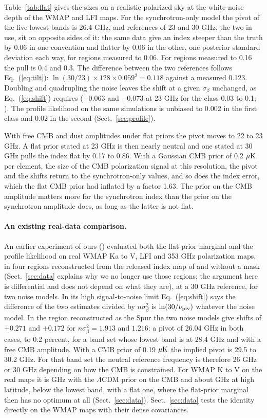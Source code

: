 Table~\ref{tab:flat} gives the sizes on a realistic polarized sky at the white-noise depth of the
WMAP and LFI maps. For the synchrotron-only model the pivot of the five lowest bands is 26.4 GHz, and
references of 23 and 30 GHz, the two in use, sit on opposite sides of it: the same data give an
index steeper than the truth by 0.06 in one convention and flatter by 0.06 in the other, one
posterior standard deviation each way, for regions measured to 0.06. For regions measured to 0.16
the pull is 0.4 and 0.3. The difference between the two references follows Eq.~(\ref{eq:tilt}):
$\ln(30/23)\times128\times0.059^2 = 0.118$ against a measured 0.123. Doubling and quadrupling the
noise leaves the shift at a given $\sigma_\beta$ unchanged, as Eq.~(\ref{eq:shift}) requires
($-0.063$ and $-0.073$ at 23 GHz for the class 0.03 to 0.1; ). The profile likelihood on
the same simulations is unbiased to 0.002 in the first class and 0.02 in the second
(Sect.~\ref{sec:profile}).

With free CMB and dust amplitudes under flat priors the pivot moves to 22 to 23 GHz. A flat
prior stated at 23 GHz is then nearly neutral and one stated at 30 GHz pulls the index flat by 0.17
to 0.86. With a Gaussian CMB prior of 0.2 $\mu\mathrm{K}$ per element, the size of the CMB polarization signal
at this resolution, the pivot and the shifts return to the synchrotron-only values, and so does the
index error, which the flat CMB prior had inflated by a factor 1.63. The prior on the CMB amplitude
matters more for the synchrotron index than the prior on the synchrotron amplitude does, as long as
the latter is not flat.

\paragraph{An existing real-data comparison.} An earlier experiment of ours () evaluated
both the flat-prior marginal and the profile likelihood on real WMAP Ka to V, LFI and 353 GHz
polarization maps, in four regions reconstructed from the released index map of \citet{svalheim2023} and
without a mask (Sect.~\ref{sec:data} explains why we no longer use those regions; the argument here is
differential and does not depend on what they are), at a 30 GHz reference, for two noise models. In its high signal-to-noise limit Eq.~(\ref{eq:shift}) says the difference of the two estimates divided by
$n\sigma_\beta^2$ is $\ln(30/\nu_{\mathrm{piv}})$ whatever the noise model. In the region reconstructed as the Spur the two noise
models give shifts of $+0.271$ and $+0.172$ for $n\sigma_\beta^2 = 1.913$ and $1.216$: a pivot of 26.04
GHz in both cases, to 0.2 percent, for a band set whose lowest band is at 28.4 GHz and with a free CMB
amplitude. With a CMB prior of 0.19 $\mu\mathrm{K}$ the implied pivot is 29.5 to 30.2 GHz. For that band set
the neutral reference frequency is therefore 26 GHz or 30 GHz depending on how the CMB is
constrained. For WMAP K to V on the real maps it is  GHz with the $\Lambda$CDM prior on
the CMB and about  GHz at high latitude, below the lowest band, with a flat one,
where the flat-prior marginal then has no optimum at all (Sect.~\ref{sec:data}).
Sect.~\ref{sec:data} tests the identity directly on the WMAP
maps with their dense covariances.
